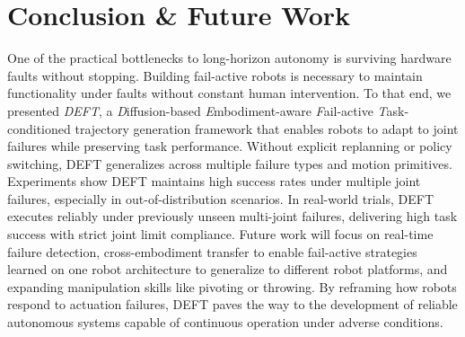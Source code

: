 \section{Conclusion \& Future Work} 
One of the practical bottlenecks to long-horizon autonomy is surviving hardware faults without stopping. Building fail-active robots is necessary to maintain functionality under faults without constant human intervention. To that end, we presented \textit{DEFT}, a \textit{D}iffusion-based \textit{E}mbodiment-aware \textit{F}ail-active \textit{T}ask-conditioned trajectory generation framework that enables robots to adapt to joint failures while preserving task performance.
Without explicit replanning or policy switching, DEFT generalizes across multiple failure types and motion primitives. Experiments show DEFT maintains high success rates under multiple joint failures, especially in out-of-distribution scenarios. In real-world trials, DEFT executes reliably under previously unseen multi-joint failures, delivering high task success with strict joint limit compliance.
Future work will focus on real-time failure detection, cross-embodiment transfer to enable fail-active strategies learned on one robot architecture to generalize to different robot platforms, and expanding manipulation skills like pivoting or throwing. By reframing how robots respond to actuation failures, DEFT paves the way to the development of reliable autonomous systems capable of continuous operation under adverse conditions. 
\vspace{-10pt}


